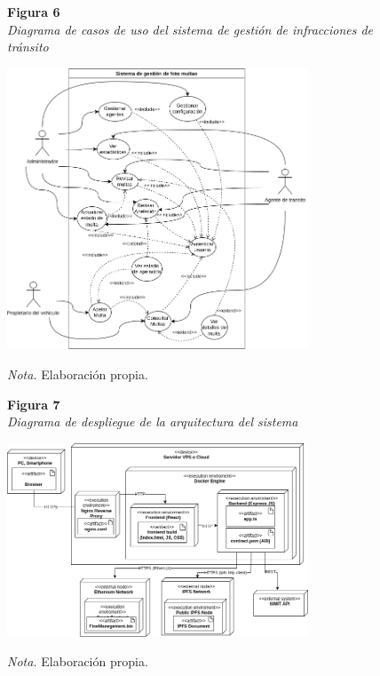 \begin{figure}[htbp]
    \begin{flushleft}
        \textbf{Figura 6}\\
        \textit{Diagrama de casos de uso del sistema de gestión de infracciones de tránsito}
    \end{flushleft}
    \centering
    \includegraphics[width=0.8\textwidth]{Images/CasosUso.png}
    \vspace{0.5em}
    \begin{flushleft}
        \textit{Nota.} Elaboración propia.
    \end{flushleft}
    \label{fig:casos_uso}
\end{figure}

\begin{figure}[htbp]
    \begin{flushleft}
        \textbf{Figura 7}\\
        \textit{Diagrama de despliegue de la arquitectura del sistema}
    \end{flushleft}
    \centering
    \includegraphics[width=0.8\textwidth]{Images/Despliegue.png}
    \vspace{0.5em}
    \begin{flushleft}
        \textit{Nota.} Elaboración propia.
    \end{flushleft}
    \label{fig:diagrama_despliegue}
\end{figure}

